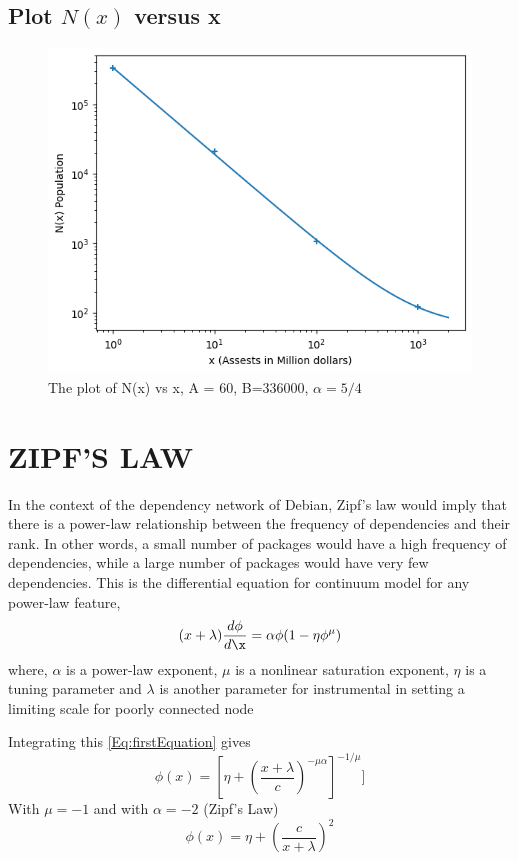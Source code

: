 \documentclass[aps,twocolumn,10pt,reprint]{revtex4}
\newcommand{\be}{\begin{equation}}
\newcommand{\ee}{\end{equation}}
\begin{document}
\subsection{Plot $N(x)$ versus x}
\vspace{-5mm}
\begin{figure}[!h]
    \centering
    \includegraphics[width=1\linewidth, center]{images/lab4_cs_1.png}
    \vspace{-5mm}
    \caption{The plot of N(x) vs x, A = 60, B=336000, $\alpha=5/4$}
    \label{fig:q1_1}
\end{figure}

\newpage
\section{ZIPF'S LAW}
In the context of the dependency network of Debian, Zipf's law would imply that there is
 a power-law relationship between the frequency of dependencies and their rank.
 In other words, a small number of packages would have a high frequency of dependencies,
  while a large number of packages would have very few dependencies.
This is the differential equation for continuum model for any power-law feature,
\be\label{Eq:firstEquation}
(x+ \lambda) \dfrac{d\phi}{d\x} = \alpha \phi (1 - \eta \phi ^ {\mu})
\ee
where, $ \alpha$ is a power-law exponent, $\mu$ is a nonlinear saturation exponent, $\eta $ is a tuning parameter and $\lambda$ is another parameter for instrumental in setting a limiting scale for poorly connected node
\newline

\noindent Integrating this \eqref{Eq:firstEquation} gives
\be\label{Eq:single-dose-x}
\phi(x) =   [\eta + (\dfrac{x+\lambda}{c})^{- \mu \alpha}]^{-1/\mu}]
\ee
With $\mu = -1$ and with $\alpha = -2$ (Zipf's Law)   
\be\label{Eq:single-dose-x}
\phi(x) =   \eta + (\dfrac{c}{x+\lambda})^{2}
\ee
\end{document}
